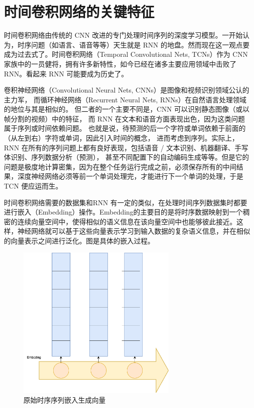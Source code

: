 \section{时间卷积网络的关键特征}
时间卷积网络由传统的 CNN 改进的专门处理时间序列的深度学习模型\cite{lea2016temporal}。一开始认为，时序问题（如语言、语音等等）天生就是 RNN 的地盘。然而现在这一观点要成为过去式了。时间卷积网络（Temporal Convolutional Nets, TCNs）作为 CNN 家族中的一员健将，拥有许多新特性，如今已经在诸多主要应用领域中击败了 RNN。看起来 RNN 可能要成为历史了。

卷积神经网络（Convolutional Neural Nets, CNNs）是图像和视频识别领域公认的主力军，
而循环神经网络（Recurrent Neural Nets, RNNs）在自然语言处理领域的地位与其是相似的。
但二者的一个主要不同是，CNN 可以识别静态图像（或以帧分割的视频）中的特征，
而 RNN 在文本和语音方面表现出色，因为这类问题属于序列或时间依赖问题。
也就是说，待预测的后一个字符或单词依赖于前面的（从左到右）字符或单词，因此引入时间的概念，
进而考虑到序列。实际上，RNN 在所有的序列问题上都有良好表现，包括语音 / 文本识别、机器翻译、手写体识别、序列数据分析（预测），
甚至不同配置下的自动编码生成等等。但是它的问题是极度地计算密集，因为在整个任务运行完成之前，必须保存所有的中间结果，深度神经网络必须等前一个单词处理完，才能进行下一个单词的处理，于是 TCN 便应运而生。

时间卷积网络需要的数据集和RNN 有一定的类似，在处理时间序列数据集时都要进行嵌入（Embedding）操作。Embedding的主要目的是将时序数据映射到一个稠密的连续向量空间中，使得相似的语义信息在该向量空间中也能够彼此接近。这样，神经网络就可以基于这些向量表示学习到输入数据的复杂语义信息，并在相似的向量表示之间进行泛化。图是具体的嵌入过程。

\begin{figure}[htbp]
  \centering
  \includegraphics[width=0.7\textwidth]{figures/embedding.drawio.png}
  \caption{原始时序序列嵌入生成向量}
\end{figure}

